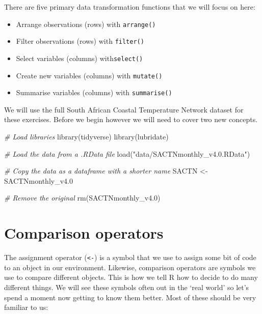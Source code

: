 \documentclass[
]{book}
\newenvironment{Shaded}{\begin{snugshade}}{\end{snugshade}}
\newcommand{\CommentTok}[1]{\textcolor[rgb]{0.56,0.35,0.01}{\textit{#1}}}
\newcommand{\FloatTok}[1]{\textcolor[rgb]{0.00,0.00,0.81}{#1}}
\newcommand{\FunctionTok}[1]{\textcolor[rgb]{0.00,0.00,0.00}{#1}}
\newcommand{\NormalTok}[1]{#1}
\newcommand{\OtherTok}[1]{\textcolor[rgb]{0.56,0.35,0.01}{#1}}
\newcommand{\StringTok}[1]{\textcolor[rgb]{0.31,0.60,0.02}{#1}}
\providecommand{\tightlist}{%
  \setlength{\itemsep}{0pt}\setlength{\parskip}{0pt}}
\begin{document}
There are five primary data transformation functions that we will focus on here:

\begin{itemize}
\tightlist
\item
  Arrange observations (rows) with \texttt{arrange()}\\
\item
  Filter observations (rows) with \texttt{filter()}\\
\item
  Select variables (columns) with\texttt{select()}\\
\item
  Create new variables (columns) with \texttt{mutate()}\\
\item
  Summarise variables (columns) with \texttt{summarise()}
\end{itemize}

We will use the full South African Coastal Temperature Network dataset for these exercises. Before we begin however we will need to cover two new concepts.

\begin{Shaded}
\begin{Highlighting}[]
\CommentTok{\# Load libraries}
\FunctionTok{library}\NormalTok{(tidyverse)}
\FunctionTok{library}\NormalTok{(lubridate)}

\CommentTok{\# Load the data from a .RData file}
\FunctionTok{load}\NormalTok{(}\StringTok{"data/SACTNmonthly\_v4.0.RData"}\NormalTok{)}

\CommentTok{\# Copy the data as a dataframe with a shorter name}
\NormalTok{SACTN }\OtherTok{\textless{}{-}}\NormalTok{ SACTNmonthly\_v4}\FloatTok{.0}

\CommentTok{\# Remove the original}
\FunctionTok{rm}\NormalTok{(SACTNmonthly\_v4}\FloatTok{.0}\NormalTok{)}
\end{Highlighting}
\end{Shaded}

\hypertarget{comparison-operators}{%
\section{Comparison operators}\label{comparison-operators}}

The assignment operator (\texttt{\textless{}-}) is a symbol that we use to assign some bit of code to an object in our environment. Likewise, comparison operators are symbols we use to compare different objects. This is how we tell R how to decide to do many different things. We will see these symbols often out in the `real world' so let's spend a moment now getting to know them better. Most of these should be very familiar to us:
\end{document}
